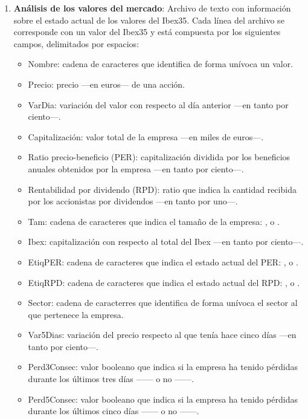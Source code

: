 \documentclass[a4paper, 11pt, titlepage]{article}
\begin{document}
\begin{enumerate}
        \item \textbf{Análisis de los valores del mercado}: Archivo de texto con información sobre el estado actual de  los valores del Ibex35. Cada línea del archivo se corresponde con un valor del Ibex35 y está compuesta por los siguientes campos, delimitados por espacios:
        \begin{itemize}
            \item Nombre: cadena de caracteres que identifica de forma unívoca un valor.
            \item Precio: precio ---en euros--- de una acción.
            \item VarDia: variación del valor con respecto al día anterior ---en tanto por ciento---.
            \item Capitalización: valor total de la empresa ---en miles de euros---.
            \item Ratio precio-beneficio (PER): capitalización dividida por los beneficios anuales obtenidos por la empresa ---en tanto por ciento---.
            \item Rentabilidad por dividendo (RPD): ratio que indica la cantidad recibida por los accionistas por dividendos ---en tanto por uno---.
            \item Tam: cadena de caracteres que indica el tamaño de la empresa: ,  o .
            \item Ibex: capitalización con respecto al total del Ibex ---en tanto por ciento---.
            \item EtiqPER: cadena de caracteres que indica el estado actual del PER: ,  o .
            \item EtiqRPD: cadena de caracteres que indica el estado actual del RPD: ,  o .
            \item Sector: cadena de caracterres que identifica de forma unívoca el sector al que pertenece la empresa.
            \item Var5Dias: variación del precio respecto al que tenía hace cinco días ---en tanto por ciento---.
            \item Perd3Consec: valor booleano que indica si la empresa ha tenido pérdidas durante los últimos tres días ------ o no ------.
            \item Perd5Consec: valor booleano que indica si la empresa ha tenido pérdidas durante los últimos cinco días ------ o no ------.

\end{itemize}
\end{enumerate}
\end{document}
